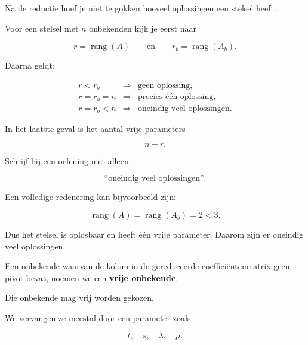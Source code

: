 \documentclass{ximera}
\begin{document}


Na de reductie hoef je niet te gokken hoeveel oplossingen een stelsel heeft.

Voor een stelsel met \(n\) onbekenden kijk je eerst naar

\[
r=\operatorname{rang}(A)
\qquad\text{en}\qquad
r_b=\operatorname{rang}(A_b).
\]

Daarna geldt:

\[
\boxed{
\begin{array}{ccl}
r<r_b
&\Longrightarrow&
\text{geen oplossing},
\\[2mm]
r=r_b=n
&\Longrightarrow&
\text{precies één oplossing},
\\[2mm]
r=r_b<n
&\Longrightarrow&
\text{oneindig veel oplossingen}.
\end{array}}
\]


In het laatste geval is het aantal vrije parameters

\[
n-r.
\]


\begin{opmerking}

Schrijf bij een oefening niet alleen:

\[
\text{``oneindig veel oplossingen''.}
\]

Een volledige redenering kan bijvoorbeeld zijn:

\[
\operatorname{rang}(A)
=
\operatorname{rang}(A_b)
=
2<3.
\]

Dus het stelsel is oplosbaar en heeft één vrije parameter.
Daarom zijn er oneindig veel oplossingen.
\end{opmerking}





Een onbekende waarvan de kolom in de gereduceerde coëfficiëntenmatrix
geen pivot bevat, noemen we een \textbf{vrije onbekende}.

Die onbekende mag vrij worden gekozen.

We vervangen ze meestal door een parameter zoals

\[
t,\quad s,\quad \lambda,\quad \mu.
\]
\end{document}

